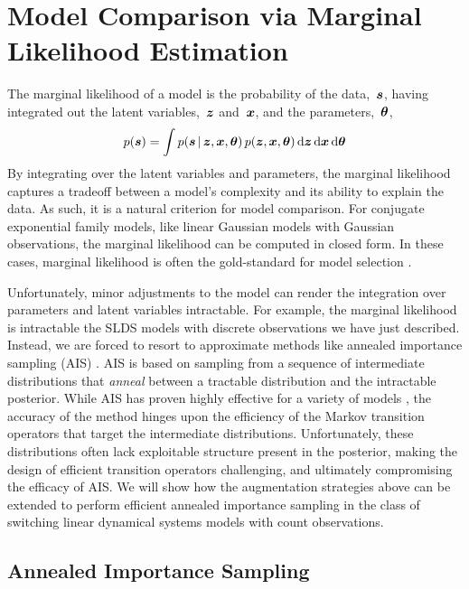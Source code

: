 \section{Model Comparison via Marginal Likelihood Estimation}
The marginal likelihood of a model is the probability of the
data,~$\boldsymbol{s}$, having integrated out the latent
variables,~$\boldsymbol{z}$ and~$\boldsymbol{x}$, and the parameters,~$\boldsymbol{\theta}$,
\begin{align*}
  p(\boldsymbol{s}) = \int p(\boldsymbol{s} \,|\, \boldsymbol{z}, \boldsymbol{x}, \boldsymbol{\theta}) \, 
  p(\boldsymbol{z}, \boldsymbol{x}, \boldsymbol{\theta}) \, \mathrm{d} \boldsymbol{z} \, \mathrm{d}\boldsymbol{x} \, \mathrm{d}\boldsymbol{\theta}
\end{align*}
By integrating over the latent variables and parameters, the marginal
likelihood captures a tradeoff between a model's complexity and its
ability to explain the data.  As such, it is a natural criterion for
model comparison. For conjugate exponential family 
models, like linear Gaussian models with Gaussian observations,
 the marginal likelihood can be computed in closed form. 
In these cases, marginal likelihood is often the gold-standard 
for model selection \citep{kass1995bayes}.

Unfortunately, minor adjustments to the model can render the
integration over parameters and latent variables intractable.  For
example, the marginal likelihood is intractable the SLDS models 
with discrete observations we have just described. 
Instead, we are forced to resort to approximate methods like annealed
importance sampling (AIS) \citep{neal2001annealed}.  AIS is based on
sampling from a sequence of intermediate distributions that
\emph{anneal} between a tractable distribution and the intractable
posterior. While AIS has proven highly effective for a variety of
models \citep{grosse2015sandwiching}, the accuracy of the method hinges
upon the efficiency of the Markov transition operators that target
the intermediate distributions.  Unfortunately, these distributions
often lack exploitable structure present in the posterior, making the
design of efficient transition operators challenging, and ultimately
compromising the efficacy of AIS. We will show how the \polyagamma 
augmentation strategies above can be extended to perform efficient 
annealed importance sampling in the class of switching linear dynamical
 systems models with count observations.

\subsection{Annealed Importance Sampling}

